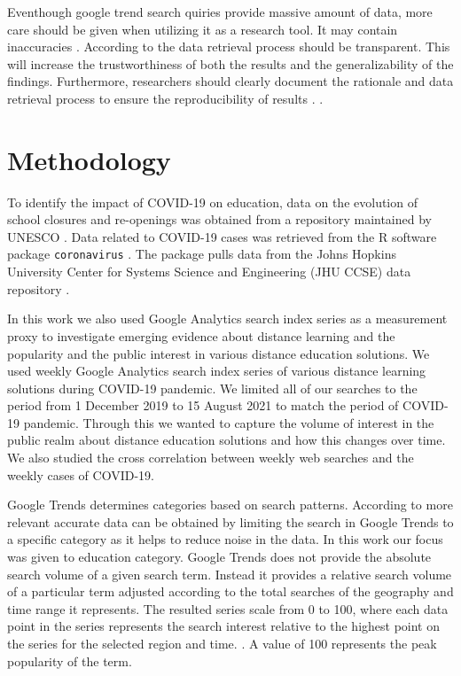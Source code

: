 \documentclass[11pt,a4paper,]{article}
\begin{document}
Eventhough google trend search quiries provide massive amount of data, more care should be given when utilizing it as a research tool. It may contain inaccuracies \autocite{carneiro2009google}. According to \textcite{nuti2014use} the data retrieval process should be transparent. This will increase the trustworthiness of both the results and the generalizability of the findings. Furthermore, researchers should clearly document the rationale and data retrieval process to ensure the reproducibility of results \autocite{nuti2014use}. .

\hypertarget{methodology}{%
\section{Methodology}\label{methodology}}

To identify the impact of COVID-19 on education, data on the evolution of school closures and re-openings was obtained from a repository maintained by UNESCO \autocite{unesco2020covid}. Data related to COVID-19 cases was retrieved from the R software \autocite{rsoftware} package \texttt{coronavirus} \autocite{coronavirusr}. The package pulls data from the Johns
Hopkins University Center for Systems Science and Engineering (JHU CCSE) data repository \autocite{dong2020interactive}.

In this work we also used Google Analytics search index series as a measurement proxy to investigate emerging evidence about distance learning and the popularity and the public interest in various distance education solutions. We used weekly Google Analytics search index series of various distance learning solutions during COVID-19 pandemic. We limited all of our searches to the period from 1 December 2019 to 15 August 2021 to match the period of COVID-19 pandemic. Through this we wanted to capture the volume of interest in the public realm about distance education solutions and how this changes over time. We also studied the cross correlation between weekly web searches and the weekly cases of COVID-19.

Google Trends determines categories based on search patterns. According to \textcite{vaughan2014web} more relevant accurate data can be obtained by limiting the search in Google Trends to a specific category as it helps to reduce noise in the data. In this work our focus was given to education category. Google Trends does not provide the absolute search volume of a given search term. Instead it provides a relative search volume of a particular term adjusted according to the total searches of the geography and time range it represents. The resulted series scale from 0 to 100, where each data point in the series represents the search interest relative to the highest point on the series for the selected region and time. \autocite{alicino2015assessing,vaughan2014web}. A value of 100 represents the peak popularity of the term.
\end{document}
